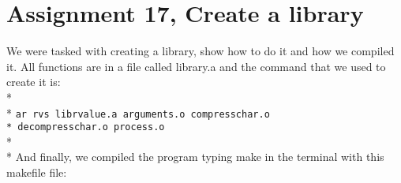 \documentclass[a4paper]{article}
\begin{document}
\section*{Assignment 17, Create a library}
We were tasked with creating a library, show how to do it and how we compiled it. All functions are in a file called library.a and the command that we used to create it is: \\* \\* 
\texttt{ar rvs librvalue.a arguments.o compresschar.o    \\*       decompresschar.o process.o} \\* \\* 
And finally, we compiled the program typing make in the terminal with this makefile file:
\subsection*{}

\end{document}
